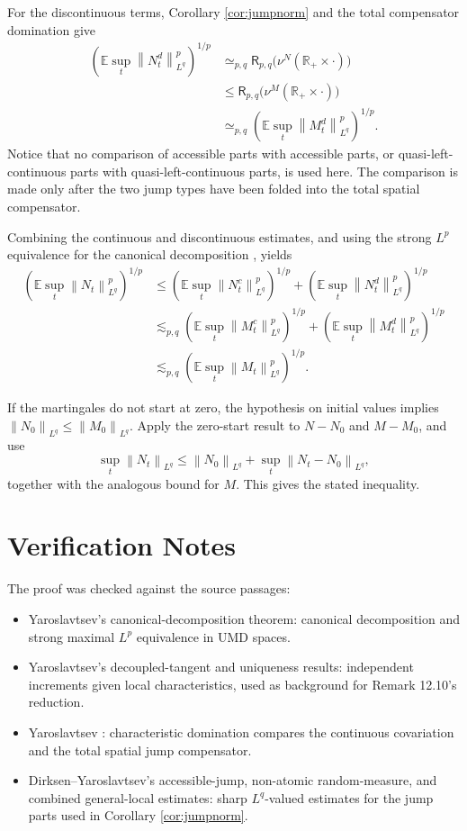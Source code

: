 \documentclass[11pt]{article}
\newcommand{\E}{\mathbb E}
\newcommand{\R}{\mathbb R}
\newcommand{\norm}[1]{\left\lVert #1\right\rVert}
\newcommand{\lesssimc}{\lesssim_{p,q}}
\newcommand{\simeqc}{\simeq_{p,q}}
\begin{document}
For the discontinuous terms, Corollary \ref{cor:jumpnorm} and the total
compensator domination give
\[
\begin{aligned}
   \left(\E\sup_t\norm{N^d_t}_{L^q}^p\right)^{1/p}
   &\simeqc
   \mathsf R_{p,q}\bigl(\nu^N(\R_+\times\cdot)\bigr)\\
   &\le
   \mathsf R_{p,q}\bigl(\nu^M(\R_+\times\cdot)\bigr)\\
   &\simeqc
   \left(\E\sup_t\norm{M^d_t}_{L^q}^p\right)^{1/p}.
\end{aligned}
\]
Notice that no comparison of accessible parts with accessible parts, or
quasi-left-continuous parts with quasi-left-continuous parts, is used here.
The comparison is made only after the two jump types have been folded into the
total spatial compensator.

Combining the continuous and discontinuous estimates, and using the strong
\(L^p\) equivalence for the canonical decomposition
\cite[Theorem 3.5]{Yaroslavtsev2019}, yields
\[
\begin{aligned}
 \left(\E\sup_t\norm{N_t}_{L^q}^p\right)^{1/p}
 &\le
 \left(\E\sup_t\norm{N^c_t}_{L^q}^p\right)^{1/p}
 +
 \left(\E\sup_t\norm{N^d_t}_{L^q}^p\right)^{1/p}\\
 &\lesssimc
 \left(\E\sup_t\norm{M^c_t}_{L^q}^p\right)^{1/p}
 +
 \left(\E\sup_t\norm{M^d_t}_{L^q}^p\right)^{1/p}\\
 &\lesssimc
 \left(\E\sup_t\norm{M_t}_{L^q}^p\right)^{1/p}.
\end{aligned}
\]

If the martingales do not start at zero, the hypothesis on initial values
implies \(\norm{N_0}_{L^q}\le\norm{M_0}_{L^q}\).  Apply the zero-start result
to \(N-N_0\) and \(M-M_0\), and use
\[
  \sup_t\norm{N_t}_{L^q}
  \le
  \norm{N_0}_{L^q}+\sup_t\norm{N_t-N_0}_{L^q},
\]
together with the analogous bound for \(M\).  This gives the stated
inequality.

\section*{Verification Notes}

The proof was checked against the source passages:
\begin{itemize}
\item Yaroslavtsev's canonical-decomposition theorem: canonical decomposition
and strong maximal \(L^p\) equivalence in UMD spaces.
\item Yaroslavtsev's decoupled-tangent and uniqueness results: independent
increments given local characteristics, used as background for Remark 12.10's
reduction.
\item Yaroslavtsev \cite[Definition 12.9 and Remark 12.10]{Yaroslavtsev2019}:
characteristic domination compares the continuous covariation and the total
spatial jump compensator.
\item Dirksen--Yaroslavtsev's accessible-jump, non-atomic random-measure, and
combined general-local estimates: sharp \(L^q\)-valued estimates for the jump
parts used in Corollary \ref{cor:jumpnorm}.
\end{itemize}
\end{document}
